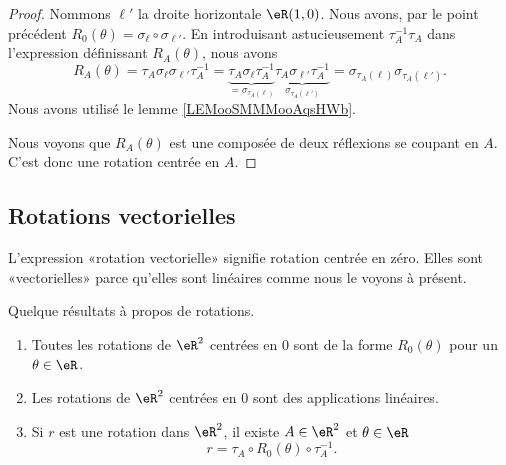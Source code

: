 \begin{proof}
    Nommons \( \ell'\) la droite horizontale \( \eR(1,0)\). Nous avons, par le point précédent \( R_0(\theta)=\sigma_{\ell}\circ \sigma_{\ell'}\). En introduisant astucieusement \( \tau_A^{-1}\tau_A\) dans l'expression définissant \( R_A(\theta)\), nous avons
    \begin{equation}
        R_A(\theta)=\tau_A\sigma_{\ell}\sigma_{\ell'}\tau_A^{-1}=\underbrace{\tau_A\sigma_{\ell}\tau_A^{-1}}_{=\sigma_{\tau_A(\ell)}}\underbrace{\tau_A\sigma_{\ell'}\tau_A^{-1}}_{\sigma_{\tau_A(\ell')}}=\sigma_{\tau_A(\ell)}\sigma_{\tau_A(\ell')}.
    \end{equation}
    Nous avons utilisé le lemme \ref{LEMooSMMMooAqsHWb}.

    Nous voyons que \( R_A(\theta)\) est une composée de deux réflexions se coupant en \( A\). C'est donc une rotation centrée en \( A\).


\end{proof}

\subsection{Rotations vectorielles}

L'expression «rotation vectorielle» signifie rotation centrée en zéro. Elles sont «vectorielles» parce qu'elles sont linéaires comme nous le voyons à présent.

\begin{proposition}     \label{PROPooTFNSooFjiWHG}
    Quelque résultats à propos de rotations.
    \begin{enumerate}
        \item       \label{ITEMooONJOooRgycsQ}
    Toutes les rotations de \( \eR^2\) centrées en \( 0\) sont de la forme \( R_0(\theta)\) pour un \( \theta\in \eR\).
\item
    Les rotations de \( \eR^2\) centrées en \( 0\) sont des applications linéaires.
        \item       \label{ITEMooSIHZooBEJhdu}
            Si \( r\) est une rotation dans \( \eR^2\), il existe \( A\in \eR^2\) et \( \theta\in \eR\)
            \begin{equation}
                r=\tau_A\circ R_0(\theta)\circ \tau_A^{-1}.
            \end{equation}
    \end{enumerate}
\end{proposition}

